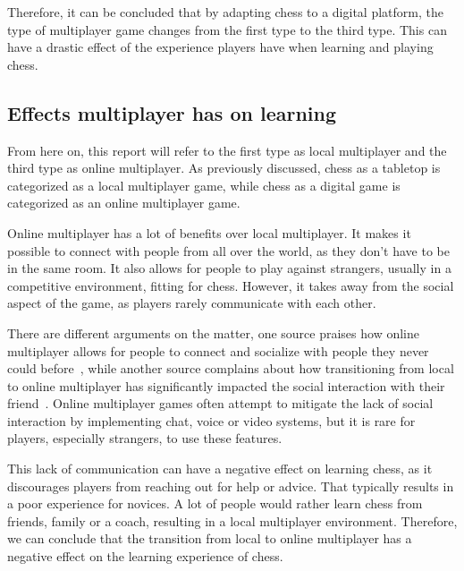 Therefore, it can be concluded that by adapting chess to a digital platform, the type of multiplayer game changes from
the first type to the third type.
This can have a drastic effect of the experience players have when learning and playing chess.

\subsection{Effects multiplayer has on learning}\label{subsec:effects-multiplayer-has-on-learning}

From here on, this report will refer to the first type as local multiplayer and the third type as online
multiplayer.
As previously discussed, chess as a tabletop is categorized as a local multiplayer game, while chess as a digital game
is categorized as an online multiplayer game.

Online multiplayer has a lot of benefits over local multiplayer.
It makes it possible to connect with people from all over the world, as they don't have to be in the same room.
It also allows for people to play against strangers, usually in a competitive environment, fitting for chess.
However, it takes away from the social aspect of the game, as players rarely communicate with each other.

There are different arguments on the matter, one source praises how online multiplayer allows for people to connect and
socialize with people they never could before~\cite{multiplayer-online}, while another source complains about how
transitioning from local to online multiplayer has significantly impacted the social interaction with their
friend~\cite{multiplayer-local}.
Online multiplayer games often attempt to mitigate the lack of social interaction by implementing chat, voice or video
systems, but it is rare for players, especially strangers, to use these features.

This lack of communication can have a negative effect on learning chess, as it discourages players from reaching out
for help or advice.
That typically results in a poor experience for novices.
A lot of people would rather learn chess from friends, family or a coach, resulting in a local multiplayer environment.
Therefore, we can conclude that the transition from local to online multiplayer has a negative effect on the learning
experience of chess.
